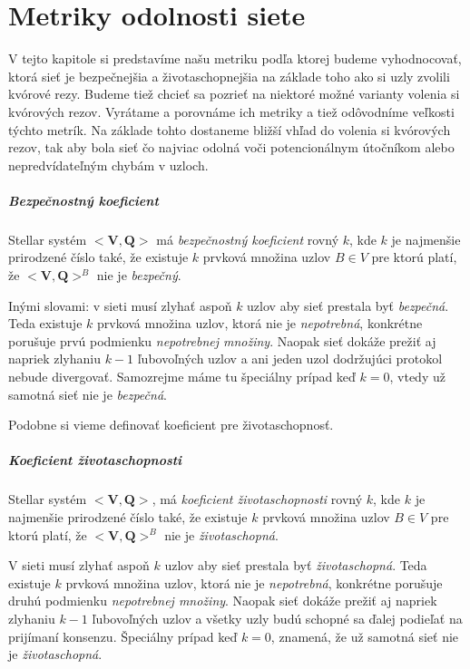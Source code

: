 \chapter{Metriky odolnosti siete}

V tejto kapitole si predstavíme našu metriku podľa ktorej budeme vyhodnocovať,
ktorá sieť je bezpečnejšia a životaschopnejšia na základe toho ako si uzly
zvolili kvórové rezy.
Budeme tiež chcieť sa pozrieť na niektoré možné varianty volenia si kvórových
rezov. Vyrátame a  porovnáme ich metriky a tiež odôvodníme veľkosti týchto metrík.
Na základe tohto dostaneme bližší vhľad do volenia si kvórových rezov, tak aby
bola sieť čo najviac odolná voči potencionálnym útočníkom alebo nepredvídateľným
chybám v uzloch.

\paragraph {Bezpečnostný koeficient} Stellar systém $<\textbf{V},\textbf{Q}>$
má \textit{bezpečnostný koeficient} rovný $k$,
kde $k$ je najmenšie prirodzené číslo také, že existuje $k$ prvková množina
uzlov $B \in V$ pre ktorú platí, že $<\textbf{V}, \textbf{Q}>^B$ nie je
\textit{bezpečný}.

\vspace{4mm}
Inými slovami: v sieti musí zlyhať aspoň $k$ uzlov aby sieť prestala byť
\textit{bezpečná}. Teda existuje $k$ prvková množina uzlov, ktorá nie je
\textit{nepotrebná}, konkrétne porušuje prvú podmienku \textit{nepotrebnej množiny}.
Naopak sieť dokáže prežiť aj napriek zlyhaniu $k-1$ ľubovoľných uzlov a ani
jeden uzol dodržujúci protokol nebude divergovať.
Samozrejme máme tu špeciálny prípad keď $k=0$, vtedy už samotná sieť nie je
\textit{bezpečná}.

Podobne si vieme definovať koeficient pre životaschopnosť.

\paragraph {Koeficient životaschopnosti} Stellar systém $<\textbf{V},\textbf{Q}>$,
má \textit{koeficient životaschopnosti} rovný $k$, kde $k$ je najmenšie prirodzené
číslo také, že existuje $k$ prvková množina uzlov $B \in V$ pre ktorú platí, že
$<\textbf{V}, \textbf{Q}>^B$ nie je \textit{životaschopná}.

\vspace{4mm}
V sieti musí zlyhať aspoň $k$ uzlov aby sieť prestala byť
\textit{životaschopná}. Teda existuje $k$ prvková množina uzlov, ktorá nie je
\textit{nepotrebná}, konkrétne porušuje druhú podmienku \textit{nepotrebnej množiny}.
Naopak sieť dokáže prežiť aj napriek zlyhaniu $k-1$ ľubovoľných uzlov a všetky uzly
budú schopné sa ďalej podieľať na prijímaní konsenzu.
Špeciálny prípad keď $k=0$, znamená, že už samotná sieť nie je \textit{životaschopná}.

